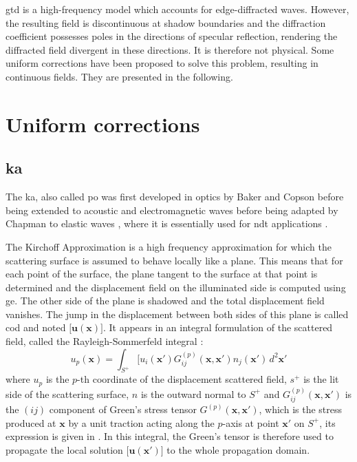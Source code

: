\acrshort{gtd} is a high-frequency model which accounts for edge-diffracted waves. However, the resulting field is discontinuous at shadow boundaries and the diffraction coefficient possesses poles in the directions of specular reflection, rendering the diffracted field divergent in these directions. It is therefore not physical. Some uniform corrections have been proposed to solve this problem, resulting in continuous fields. They are presented in the following. 

\section{Uniform corrections}

\subsection{\acrfull{ka}}
The \acrfull{ka}, also called \acrfull{po} was first developed in optics by Baker and Copson \cite{POoptics} before being extended to acoustic and electromagnetic waves \cite{POtechreport, POLewis} before being adapted by Chapman to elastic waves \cite{POChapman}, where it is essentially used for \acrshort{ndt} applications \cite{Schmerr,Dorval}.

The Kirchoff Approximation is a high frequency approximation for which the scattering surface is assumed to behave locally like a plane. This means that for each point of the surface, the plane tangent to the surface at that point is determined and the displacement field on the illuminated side is computed using \acrshort{ge}. The other side of the plane is shadowed and the total displacement field vanishes. The jump in the displacement between both sides of this plane is called \acrfull{cod} and noted $\lbrack \mathbf{u}(\mathbf{x}) \rbrack$. It appears in an integral formulation of the scattered field, called the Rayleigh-Sommerfeld integral \cite{POChapman} :
\begin{equation}
u_p(\mathbf{x})=\int_{S^+}\lbrack u_i(\mathbf{x'})G_{ij}^{(p)}(\mathbf{x},\mathbf{x'})n_j(\mathbf{x'})\,d^2\mathbf{x'}
\label{intKA}
\end{equation}
where $u_p$ is the $p$-th coordinate of the displacement scattered field, $s^+$ is the lit side of the scattering surface, $n$ is the outward normal to $S^+$ and $G_{ij}^{(p)}(\mathbf{x},\mathbf{x'})$ is the $(ij)$ component of Green's stress tensor $G^{(p)}(\mathbf{x},\mathbf{x'})$, which is the stress produced at $\mathbf{x}$ by a unit traction acting along the $p$-axis at point $\mathbf{x'}$ on $S^+$, its expression is given in \cite{POChapman}. In this integral, the Green's tensor is therefore used to propagate the local solution $\lbrack \mathbf{u}(\mathbf{x'}) \rbrack$ to the whole propagation domain.

